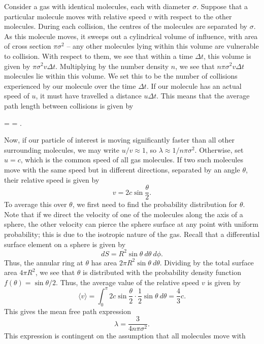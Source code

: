 \documentclass[11pt]{article}
\newcommand\E[1]{\langle #1 \rangle}
\theoremstyle{definition}
\newenvironment{boxedeq*}%
    {\begin{equationbox}\begin{equation*}}%
    {\end{equation*}\end{equationbox}}
\theoremstyle{remark}
\numberwithin{equation}{section}
\begin{document}
    Consider a gas with identical molecules, each with diameter $\sigma$.  Suppose
    that a particular molecule moves with relative speed $v$ with respect to the
    other molecules. During each collision, the centres of the molecules are
    separated by $\sigma$. As this molecule moves, it sweeps out a cylindrical
    volume of influence, with area of cross section $\pi \sigma^2$ -- any other
    molecules lying within this volume are vulnerable to collision. With respect to
    them, we see that within a time $\Delta t$, this volume is given by $\pi
    \sigma^2 v\Delta t$. Multiplying by the number density $n$, we see that
    $n\pi\sigma^2 v\Delta t$ molecules lie within this volume. We set this to be the
    number of collisions experienced by our molecule over the time $\Delta t$. If
    our molecule has an actual speed of $u$, it must have travelled a distance $u
    \Delta t$. This means that the average path length between collisions is given
    by
    \begin{boxedeq*}
        \lambda =  = .
    \end{boxedeq*}
    Now, if our particle of interest is moving significantly faster than all other
    surrounding molecules, we may write $u /v \approx 1$, so $\lambda \approx 1
    /n\pi\sigma^2$. Otherwise, set $u = c$, which is the common speed of all gas
    molecules. If two such molecules move with the same speed but in different
    directions, separated by an angle $\theta$, their relative speed is given by \[
        v = 2c\sin\frac{\theta}{2}.
    \] To average this over $\theta$, we first need to find the probability
    distribution for $\theta$. Note that if we direct the velocity of one of the
    molecules along the axis of a sphere, the other velocity can pierce the sphere
    surface at any point with uniform probability; this is due to the isotropic
    nature of the gas. Recall that a differential surface element on a sphere is
    given by \[
        dS = R^2\sin\theta \:d\theta \:d\phi.
    \] Thus, the annular ring at $\theta$ has area $2\pi R^2 \sin\theta \:d\theta$.
    Dividing by the total surface area $4\pi R^2$, we see that $\theta$ is
    distributed with the probability density function $f(\theta) = \sin\theta /2$.
    Thus, the average value of the relative speed $v$ is given by \[
        \E{v} = \int_0^\pi 2c \sin\frac{\theta}{2}\cdot \frac{1}{2} \sin\theta 
        \:d\theta = \frac{4}{3}c.
    \] This gives the mean free path expression \[
        \lambda = \frac{3}{4n\pi\sigma^2}.
    \] This expression is contingent on the assumption that all molecules move with
\end{document}
